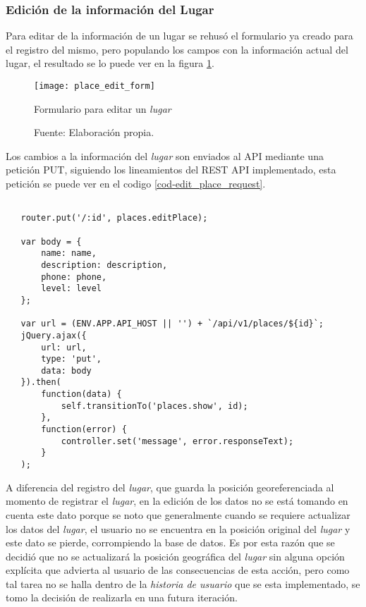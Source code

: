 \subsubsection{Edición de la información del Lugar}

Para editar de la información de un lugar se rehusó el formulario ya creado para el registro del mismo, pero populando los campos con la información actual del lugar, el resultado se lo puede ver en la figura \ref{fig:place_edit_form}. \\

\begin{figure}[H]
     \begin{center}
       \texttt{[image: place\_edit\_form]}

       \caption{Formulario para editar un \emph{lugar}}
       \label{fig:place_edit_form}
       \caption*{Fuente: Elaboración propia.}
     \end{center}
\end{figure}


Los cambios a la información del \emph{lugar} son enviados al API mediante una petición PUT, siguiendo los lineamientos del REST API implementado, esta petición se puede ver en el codigo \ref{cod-edit_place_request}.

\newpage
\begin{center}
 \begin{lstlisting}[label=cod-edit_place_request,caption=Petición HTTP para editar un lugar.]

   router.put('/:id', places.editPlace);

   var body = {
       name: name,
       description: description,
       phone: phone,
       level: level
   };

   var url = (ENV.APP.API_HOST || '') + `/api/v1/places/${id}`;
   jQuery.ajax({
       url: url,
       type: 'put',
       data: body
   }).then(
       function(data) {
           self.transitionTo('places.show', id);
       },
       function(error) {
           controller.set('message', error.responseText);
       }
   );

 \end{lstlisting}
\end{center}

A diferencia del registro del \emph{lugar}, que guarda la posición georeferenciada al momento de registrar el \emph{lugar}, en la edición de los datos no se está tomando en cuenta este dato porque se noto que generalmente cuando se requiere actualizar los datos del \emph{lugar}, el usuario no se encuentra en la posición original del \emph{lugar} y este dato se pierde, corrompiendo la base de datos. Es por esta razón que se decidió que no se actualizará la posición geográfica del \emph{lugar} sin alguna opción explícita que advierta al usuario de las consecuencias de esta acción, pero como tal tarea no se halla dentro de la \emph{historia de usuario} que se esta implementado, se tomo la decisión de realizarla en una futura iteración.








